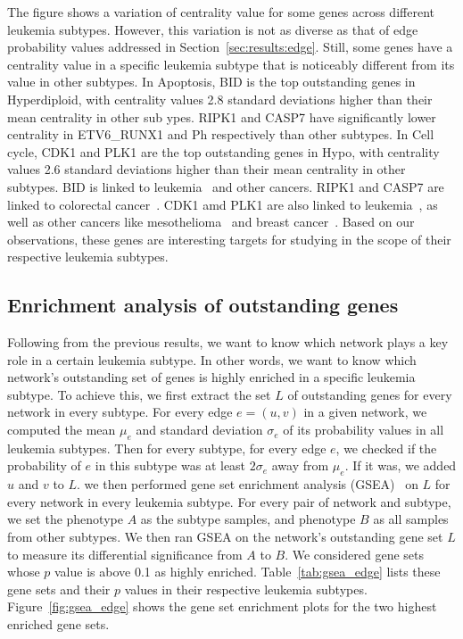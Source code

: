 \documentclass[runningheads,a4paper]{llncs}
\begin{document}
The figure shows a variation of centrality value for some genes across different
leukemia subtypes. However, this variation is not as diverse as that of edge
probability values addressed in Section~\ref{sec:results:edge}. Still, some
genes have a centrality value in a specific leukemia subtype that is noticeably
different from its value in other subtypes. In Apoptosis, BID is the top
outstanding genes in Hyperdiploid, with centrality values 2.8 standard
deviations higher than their mean centrality in other sub ypes. RIPK1 and CASP7
have significantly lower centrality in ETV6\_RUNX1 and Ph respectively than
other subtypes. In Cell cycle, CDK1 and PLK1 are the top outstanding genes in
Hypo, with centrality values 2.6 standard deviations higher than their mean
centrality in other subtypes. BID is linked to leukemia~\cite{bid_leukemia} and
other cancers. RIPK1 and CASP7 are linked to colorectal
cancer~\cite{ripk1_casp7}. CDK1 amd PLK1 are also linked to
leukemia~\cite{cdk1_plk1_leukemia}, as well as other cancers like
mesothelioma~\cite{cdk1_plk1_meso} and breast
cancer~\cite{cdk1_breast,plk1_breast}. Based on our observations, these genes
are interesting targets for studying in the scope of their respective leukemia
subtypes.

\subsection{Enrichment analysis of outstanding genes}

Following from the previous results, we want to know which network plays a
key role in a certain leukemia subtype. In other words, we want to know which
network's outstanding set of genes is highly enriched in a specific leukemia
subtype. To achieve this, we first extract the set $L$ of outstanding genes for
every network in every subtype. For every edge $e = (u,v)$ in a given network,
we computed the mean $\mu_e$ and standard deviation $\sigma_e$ of its
probability values in all leukemia subtypes. Then for every subtype, for every
edge $e$, we checked if the probability of $e$ in this subtype was at least
$2\sigma_e$ away from $\mu_e$. If it was, we added $u$ and $v$ to $L$. we then
performed gene set enrichment analysis (GSEA)~\cite{gsea} on $L$ for every
network in every leukemia subtype. For every pair of network and subtype, we
set the phenotype $A$ as the subtype samples, and phenotype $B$ as all samples
from other subtypes. We then ran GSEA on the network's outstanding gene set $L$
to measure its differential significance from $A$ to $B$. We considered gene
sets whose $p$ value is above 0.1 as highly enriched. Table~\ref{tab:gsea_edge}
lists these gene sets and their $p$ values in their respective leukemia
subtypes. Figure~\ref{fig:gsea_edge} shows the gene set enrichment plots for the
two highest enriched gene sets.
\end{document}
